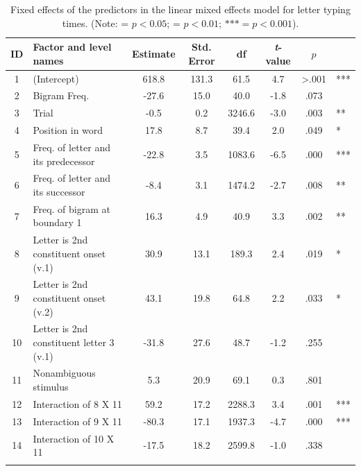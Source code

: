\documentclass[output=paper]{langsci/langscibook}
\begin{document}
\begin{table}
\caption{Fixed effects of the predictors in the linear mixed effects model for letter typing times. (Note: \text{*} = $p < 0.05$; \text{**} = $p < 0.01$; $\text{***} = p < 0.001$).\label{tab:libben:5}}
\begin{tabular}{clSSSSS[table-format=<1.3]l}
\lsptoprule
 ID & Factor and level names &  {Estimate} &  {Std. Error} &  {df} &  {\textit{t}-value} &  {$p$} & \\ & (Intercept) &  618.8 &  131.3 &  61.5 &  4.7 &  >.001 & ***\\
 2 & Bigram Freq. &  -27.6 &  15.0 &  40.0 &  -1.8 &  .073 & \\
 3 & Trial &  -0.5 &  0.2 &  3246.6 &  -3.0 &  .003 & **\\
 4 & Position in word &  17.8 &  8.7 &  39.4 &  2.0 &  .049 & *\\
 5 & Freq. of letter and its predecessor &  -22.8 &  3.5 &  1083.6 &  -6.5 &  .000 & ***\\
 6 & Freq. of letter and its successor &  -8.4 &  3.1 &  1474.2 &  -2.7 &  .008 & **\\
 7 & Freq. of bigram at boundary 1 &  16.3 &  4.9 &  40.9 &  3.3 &  .002 & **\\
 8 & Letter is 2nd constituent onset (v.1) &  30.9 &  13.1 &  189.3 &  2.4 &  .019 & *\\
 9 & Letter is 2nd constituent onset (v.2) &  43.1 &  19.8 &  64.8 &  2.2 &  .033 & *\\
 10 & Letter is 2nd constituent letter 3 (v.1) &  -31.8 &  27.6 &  48.7 &  -1.2 &  .255 & \\
 11 & Nonambiguous stimulus &  5.3 &  20.9 &  69.1 &  0.3 &  .801 & \\
 12 & Interaction of 8 X 11 &  59.2 &  17.2 &  2288.3 &  3.4 &  .001 & ***\\
 13 & Interaction of 9 X  11 &  -80.3 &  17.1 &  1937.3 &  -4.7 &  .000 & ***\\
 14 & Interaction of 10 X  11 &  -17.5 &  18.2 &  2599.8 &  -1.0 &  .338 & \\
\lspbottomrule
\end{tabular}
\end{table}
  
\end{document}
